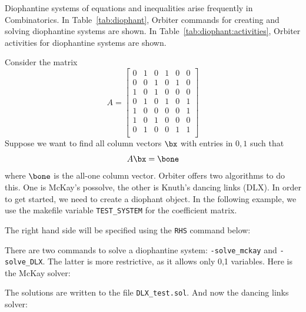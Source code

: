 Diophantine systems of equations and inequalities arise frequently in Combinatorics.
In Table~\ref{tab:diophant}, Orbiter commands for creating and solving diophantine systems are shown.
In Table~\ref{tab:diophant:activities}, Orbiter activities for diophantine systems are shown.


Consider the matrix 
$$
A= 
\left[
\begin{array}{cccccc}
0&1&0&1&0&0\\
0&0&1&0&1&0\\
1&0&1&0&0&0\\
0&1&0&1&0&1\\
1&0&0&0&0&1\\
1&0&1&0&0&0\\
0&1&0&0&1&1\\
\end{array}
\right]
$$
Suppose we want to find all column vectors $\bx$ with entries in $0,1$ such that 
$$
A \bx = \bone
$$
where $\bone$ is the all-one column vector.
Orbiter offers two algorithms to do this. 
One is McKay's possolve, the other is Knuth's dancing links (DLX).
In order to get started, we need to create a diophant object.
In the following example, we use the makefile variable \verb'TEST_SYSTEM' for the 
coefficient matrix. 


The right hand side will be specified using the \verb'RHS' command below:



There are two commands to solve a diophantine system: \verb'-solve_mckay' and \verb'-solve_DLX'. The latter is more restrictive, 
as it allows only 0,1 variables.
Here is the McKay solver:


The solutions are written to the file \verb'DLX_test.sol'. 
And now the dancing links solver:




\bigskip

